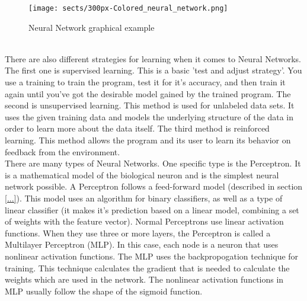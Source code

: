 \begin{figure}[htbp]
    \centering
    \texttt{[image: sects/300px-Colored\_neural\_network.png]}
    \caption{Neural Network graphical example}
    \label{fig: Neural network}
\end{figure}

\\

\noindent There are also different strategies for learning when it comes to Neural Networks.
The first one is supervised learning.
This is a basic 'test and adjust strategy'.
You use a training to train the program, test it for it's accuracy, and then train it again until you've got the desirable model gained by the trained program.
The second is unsupervised learning.
This method is used for unlabeled data sets.
It uses the given training data and models the underlying structure of the data in order to learn more about the data itself.
The third method is reinforced learning.
This method allows the program and its user to learn its behavior on feedback from the environment. \\

\noident There are many types of Neural Networks.
One specific type is the Perceptron.
It is a mathematical model of the biological neuron and is the simplest neural network possible.
A Perceptron follows a feed-forward model (described in section \ref{...}).
This model uses an algorithm for binary classifiers, as well as a type of linear classifier (it makes it's prediction based on a linear model, combining a set of weights with the feature vector).
Normal Perceptrons use linear activation functions.
When they use three or more layers, the Perceptron is called a Multilayer Perceptron (MLP).
In this case, each node is a neuron that uses nonlinear activation functions.
The MLP uses the backpropogation technique for training.
This technique calculates the gradient that is needed to calculate the weights which are used in the network.
The nonlinear activation functions in MLP usually follow the shape of the sigmoid function.

